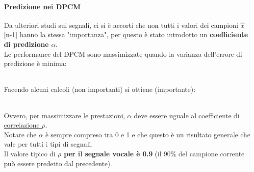 \documentclass{article}
\begin{document}
				\paragraph{Predizione nei DPCM\\}
					Da ulteriori studi sui segnali, ci si è accorti che non tutti i valori dei campioni $\hat{x}$[n-1] hanno la stessa "importanza", per questo è stato introdotto un \textbf{coefficiente di predizione \textit{$\alpha$}}.
					\\Le performance del DPCM sono massimizzate quando la varianza dell'errore di predizione è minima:
					\begin{figure}[ht!]
					\end{figure}
					\\Facendo alcuni calcoli (non importanti) si ottiene (importante):
					\begin{figure}[ht!]
					\end{figure}
					\\Ovvero, \underline{per massimizzare le prestazioni, \textit{$\alpha$} deve essere uguale al coefficiente di} \\\underline{correlazione \textit{$\rho$}}.
					\\Notare che \textit{$\alpha$} è sempre compreso tra 0 e 1 e che questo è un risultato generale che vale per tutti i tipi di segnali.
					\\Il valore tipico di \textbf{\textit{$\rho$} per il segnale vocale è 0.9} (il 90\% del campione corrente può essere predetto dal precedente).
\end{document}
